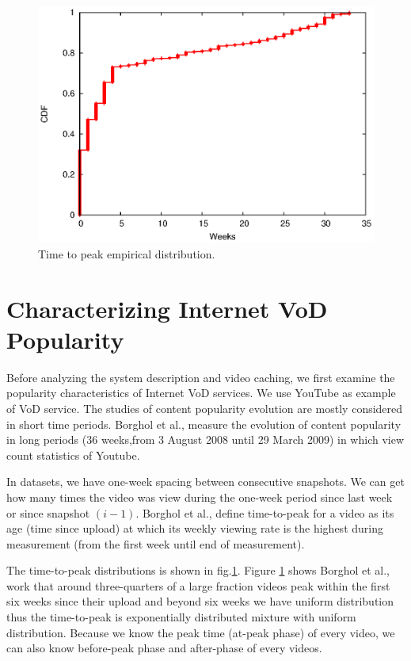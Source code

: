 \documentclass[10pt,final,journal,a4paper]{IEEEtran}
\begin{document}
\begin{figure}[!t]
\begin{center}
\includegraphics[scale=0.6]{graphs/timetopeak.eps}
\end{center}
\caption{Time to peak empirical distribution.}
\label{fig:timetopeak}
\end{figure} 

\section{Characterizing Internet VoD Popularity}\label{popularity}
Before analyzing the system description and video caching, we first examine the popularity characteristics of Internet VoD services.
We use YouTube as example of VoD service.
The studies of content popularity evolution are mostly considered in short time periods.
Borghol et al., \cite{Borghol:2011:CMP:2039452.2039717} measure the evolution of content popularity in long periods (36 weeks,from 3 August 2008 until 29 March 2009) in which view count statistics of Youtube. 

In datasets, we have one-week spacing between consecutive snapshots.  
We can get how many times the video was view during the one-week period since last week or since snapshot $(i-1)$. 
Borghol et al., \cite{Borghol:2011:CMP:2039452.2039717} define time-to-peak for a video as its age (time since upload) at which its weekly viewing rate is the highest during measurement (from the first week until end of measurement).

The time-to-peak distributions is shown in fig.\ref{fig:timetopeak}.
Figure \ref{fig:timetopeak} shows Borghol et al., \cite{Borghol:2011:CMP:2039452.2039717} work that around three-quarters of a large fraction videos peak within the first six weeks since their upload and beyond six weeks we have uniform distribution thus the time-to-peak is exponentially distributed mixture with uniform distribution. 
Because we know the peak time (at-peak phase) of every video, we can also know before-peak phase and after-phase of every videos.
\end{document}
